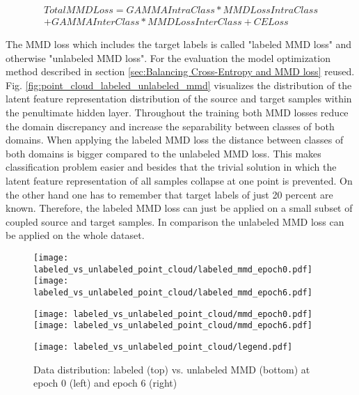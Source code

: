 \begin{equation}
\begin{split}
    TotalMMDLoss = GAMMAIntraClass * MMDLossIntraClass\\ + GAMMAInterClass * MMDLossInterClass + CELoss
\end{split}
\end{equation}

 The MMD loss which includes the target labels is called "labeled MMD loss" and otherwise "unlabeled MMD loss". For the evaluation the model optimization method described in section \ref{sec:Balancing Cross-Entropy and MMD loss} reused. Fig. \ref{fig:point_cloud_labeled_unlabeled_mmd} visualizes the distribution of the latent feature representation distribution of the source and target samples within the penultimate hidden layer. Throughout the training both MMD losses reduce the domain discrepancy and increase the separability between classes of both domains. When applying the labeled MMD loss the distance between classes of both domains is bigger compared to the unlabeled MMD loss. This makes classification problem easier and besides that the trivial solution in which the latent feature representation of all samples collapse at one point is prevented. On the other hand one has to remember that target labels of just 20 percent are known. Therefore, the labeled MMD loss can just be applied on a small subset of coupled source and target samples. In comparison the unlabeled MMD loss can be applied on the whole dataset.




\begin{figure}[p]
  \centering
  \texttt{[image: labeled\_vs\_unlabeled\_point\_cloud/labeled\_mmd\_epoch0.pdf]}
  \hspace{.3cm}
  \texttt{[image: labeled\_vs\_unlabeled\_point\_cloud/labeled\_mmd\_epoch6.pdf]}

  \vspace{.1cm}

  \texttt{[image: labeled\_vs\_unlabeled\_point\_cloud/mmd\_epoch0.pdf]}
  \hspace{.1cm}
  \texttt{[image: labeled\_vs\_unlabeled\_point\_cloud/mmd\_epoch6.pdf]}

  \vspace{.1cm}
  
  \texttt{[image: labeled\_vs\_unlabeled\_point\_cloud/legend.pdf]}


  \caption{Data distribution: labeled (top) vs. unlabeled MMD (bottom) at epoch 0 (left) and epoch 6 (right)}
  \label{fig:learning_curves_influence_mmd_feature_extractor}
\end{figure}



